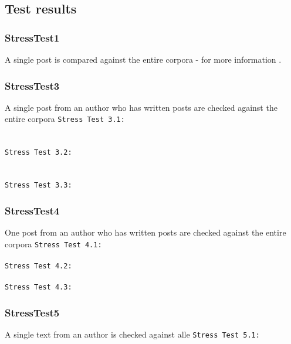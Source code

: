 \begin{description}
\subsection{Test results}

\subsubsection{StressTest1}
A single post is compared against the entire corpora - for more information .


\subsubsection{StressTest3}
A single post from an author who has written  posts are checked against the entire corpora  
\texttt{Stress Test 3.1:}\\

\\ \\

\texttt{Stress Test 3.2:}\\
\\ \\

\texttt{Stress Test 3.3:}\\


\subsubsection{StressTest4}
One post from an author who has written  posts are checked against the entire corpora  
\texttt{Stress Test 4.1:}\\
\\

\texttt{Stress Test 4.2:}\\
\\

\texttt{Stress Test 4.3:}\\


\subsubsection{StressTest5}
A single text from an author is checked against alle 
\texttt{Stress Test 5.1:}\\
\\


\end{description}

